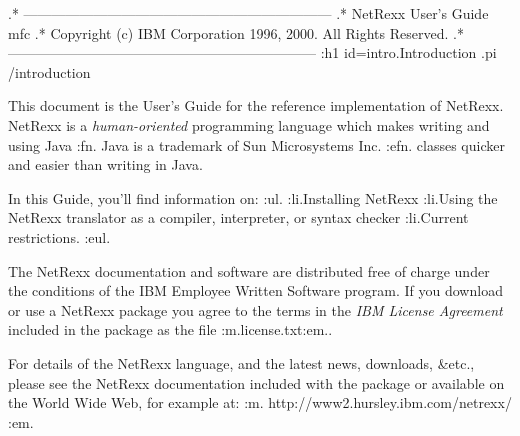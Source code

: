 .* ------------------------------------------------------------------
.* NetRexx User's Guide                                              mfc
.* Copyright (c) IBM Corporation 1996, 2000.  All Rights Reserved.
.* ------------------------------------------------------------------
:h1 id=intro.Introduction
.pi /introduction

This document is the User's Guide for the reference implementation of
NetRexx.
NetRexx is a \emph{human-oriented} programming language which makes writing
and using Java
:fn.
Java is a trademark of Sun Microsystems Inc.
:efn.
classes quicker and easier than writing in Java.

In this Guide, you'll find information on:
:ul.
:li.Installing NetRexx
:li.Using the NetRexx translator as a compiler, interpreter, or syntax
checker
:li.Current restrictions.
:eul.

The NetRexx documentation and software are distributed free of charge
under the conditions of the IBM Employee Written Software program.
If you download or use a NetRexx package you agree to the terms in the
\emph{IBM License Agreement} included in the package as the
file :m.license.txt:em..

For details of the NetRexx language, and the latest news, downloads,
&etc., please see the NetRexx documentation included with the package or
available on the World Wide Web, for example at: :m.
http://www2.hursley.ibm.com/netrexx/
:em.

